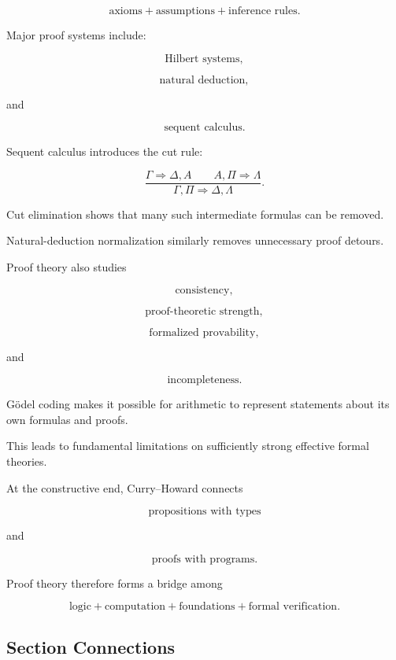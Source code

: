 \[
\boxed{
\text{axioms}
+
\text{assumptions}
+
\text{inference rules}.
}
\]

Major proof systems include:

\[
\boxed{
\text{Hilbert systems},
}
\]

\[
\boxed{
\text{natural deduction},
}
\]

and

\[
\boxed{
\text{sequent calculus}.
}
\]

Sequent calculus introduces the cut rule:

\[
\boxed{
\frac{
\Gamma\Rightarrow\Delta,A
\qquad
A,\Pi\Rightarrow\Lambda
}{
\Gamma,\Pi\Rightarrow\Delta,\Lambda
}.
}
\]

Cut elimination shows that many such intermediate formulas can be removed.

Natural-deduction normalization similarly removes unnecessary proof
detours.

Proof theory also studies

\[
\boxed{
\text{consistency},
}
\]

\[
\boxed{
\text{proof-theoretic strength},
}
\]

\[
\boxed{
\text{formalized provability},
}
\]

and

\[
\boxed{
\text{incompleteness}.
}
\]

Gödel coding makes it possible for arithmetic to represent statements
about its own formulas and proofs.

This leads to fundamental limitations on sufficiently strong effective
formal theories.

At the constructive end, Curry--Howard connects

\[
\boxed{
\text{propositions with types}
}
\]

and

\[
\boxed{
\text{proofs with programs}.
}
\]

Proof theory therefore forms a bridge among

\[
\boxed{
\text{logic}
+
\text{computation}
+
\text{foundations}
+
\text{formal verification}.
}
\]

\subsection{Section Connections}
\label{subsec:proof-theory-connections}

